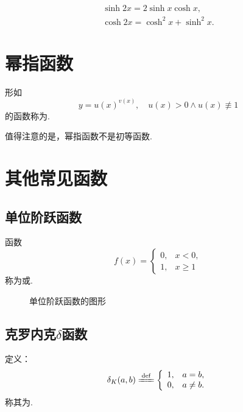 \begin{theorem}
\begin{gather}
	\sinh2x = 2 \sinh x\cosh x, \\
	\cosh2x = \cosh^2x + \sinh^2x.
\end{gather}
\end{theorem}

\section{幂指函数}
\begin{definition}
形如\[
	y = u(x)^{v(x)},
	\quad u(x) > 0 \land u(x) \not\equiv 1
\]的函数称为.
\end{definition}
值得注意的是，幂指函数不是初等函数.

\section{其他常见函数}
\subsection{单位阶跃函数}
\begin{definition}
函数\[
f(x) = \left\{ \begin{array}{cc}
0, & x < 0, \\
1, & x \geq 1
\end{array} \right.
\]称为或.
\end{definition}

\begin{figure}[ht]
	\centering
	\caption{单位阶跃函数的图形}
\end{figure}

\subsection{克罗内克\texorpdfstring{\(\delta\)}{\textdelta}函数}
\begin{definition}
定义：\[
\delta_K(a,b)
\defeq \left\{ \begin{array}{cl}
	1, & a = b, \\
	0, & a \neq b.
\end{array} \right.
\]称其为.
\end{definition}

